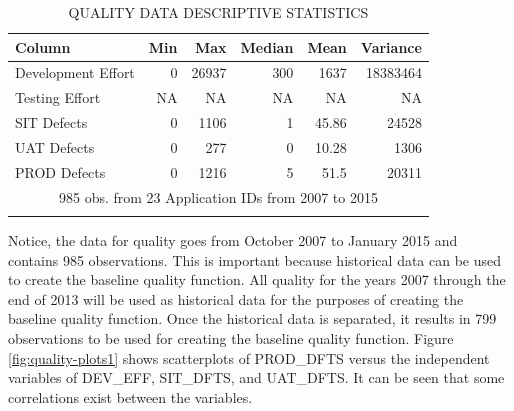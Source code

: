 \documentclass[SDSUThesis.tex]{subfiles}
\begin{document}
            
            \begin{longtable}{@{}l rr rrr}
                \toprule%
                 \centering%
                 {\bfseries Column}
                 & {\bfseries Min}
                 & {\bfseries Max}
                 & {\bfseries Median}
                 & {\bfseries Mean}
                 & {\bfseries Variance} \\
                
                \cmidrule[0.2pt](r{0.125em}){1-1}%
                \cmidrule[0.2pt](lr{0.125em}){2-2}%
                \cmidrule[0.2pt](l{0.125em}){3-3}%
                \cmidrule[0.2pt](l{0.125em}){4-4}%
                \cmidrule[0.2pt](l{0.125em}){5-5}%
                \endhead
                
                Development Effort & 0 & 26937 & 300 & 1637 & 18383464 \\
                \myrowcolour%
                Testing Effort & NA & NA & NA & NA  & NA\\
                SIT Defects & 0 & 1106 & 1 & 45.86 & 24528 \\
                \myrowcolour%
                UAT Defects & 0 & 277 & 0 & 10.28 & 1306 \\
                PROD Defects & 0 & 1216 & 5 & 51.5 & 20311 \\
                
                \bottomrule
                
                \multicolumn{6}{c}{985 obs. from 23 Application IDs from 2007 to 2015} \\
                
                \caption{QUALITY DATA DESCRIPTIVE STATISTICS}
                \label{tab:quality_desc}
            \end{longtable}
            
            Notice, the data for quality goes from October 2007 to January 2015
            and contains 985 observations.
            This is important because historical data can be used to create the
            baseline quality function.  All quality for the years 2007 through 
            the end of 2013
            will be used as historical data for the purposes of creating
            the baseline quality function.  Once the historical data is separated,
            it results in 799 observations to be used for creating the baseline
            quality function.  Figure \ref{fig:quality-plots1} shows scatterplots
            of PROD\_DFTS versus the independent variables of DEV\_EFF, SIT\_DFTS,
            and UAT\_DFTS.  It can be seen that some correlations exist between
            the variables.
            
\end{document}
